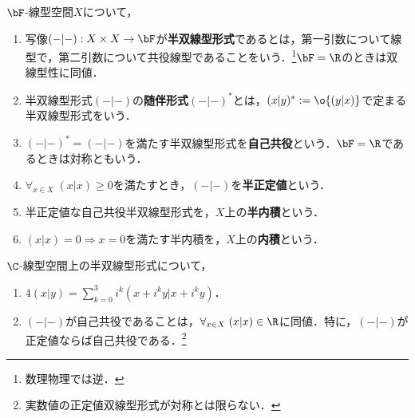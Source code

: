 \documentclass[uplatex,dvipdfmx]{jsreport}
\begin{document}
\begin{definition}
    $\bF$-線型空間$X$について，
    \begin{enumerate}
        \item 写像$(-|-):X\times X\to\bF$が\textbf{半双線型形式}であるとは，第一引数について線型で，第二引数について共役線型であることをいう．\footnote{数理物理では逆．}$\bF=\R$のときは双線型性に同値．
        \item 半双線型形式$(-|-)$の\textbf{随伴形式}$(-|-)^*$とは，$(x|y)^*:=\o{(y|x)}$で定まる半双線型形式をいう．
        \item $(-|-)^*=(-|-)$を満たす半双線型形式を\textbf{自己共役}という．$\bF=\R$であるときは対称ともいう．
        \item $\forall_{x\in X}\;(x|x)\ge 0$を満たすとき，$(-|-)$を\textbf{半正定値}という．
        \item 半正定値な自己共役半双線型形式を，$X$上の\textbf{半内積}という．
        \item $(x|x)=0\Rightarrow x=0$を満たす半内積を，$X$上の\textbf{内積}という．
    \end{enumerate}
\end{definition}

\begin{lemma}[自己共役性の特徴付け]\label{lemma-characterization-of-self-adjointness}
    $\C$-線型空間上の半双線型形式について，
    \begin{enumerate}
        \item $4(x|y)=\sum^3_{k=0}i^k(x+i^ky|x+i^ky)$．
        \item $(-|-)$が自己共役であることは，$\forall_{x\in X}\;(x|x)\in\R$に同値．特に，$(-|-)$が正定値ならば自己共役である．\footnote{実数値の正定値双線型形式が対称とは限らない．}
    \end{enumerate}
\end{lemma}
\end{document}
